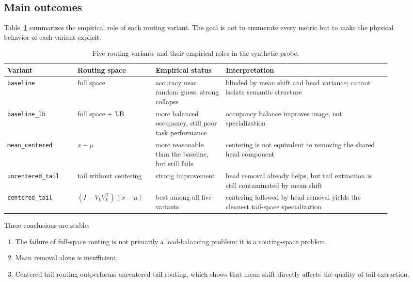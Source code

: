 \documentclass[11pt]{article}
\newcommand{\tablesize}{\footnotesize}
\begin{document}
\subsection{Main outcomes}

Table~\ref{tab:variant-summary} summarizes the empirical role of each routing variant. The goal is not to enumerate every metric but to make the physical behavior of each variant explicit.

\begin{table}[H]
\centering
\tablesize
\begin{adjustbox}{max width=\linewidth}
\begin{tabular}{>{\raggedright\arraybackslash}p{0.17\linewidth} >{\raggedright\arraybackslash}p{0.18\linewidth} >{\raggedright\arraybackslash}p{0.17\linewidth} >{\raggedright\arraybackslash}p{0.40\linewidth}}
\toprule
Variant & Routing space & Empirical status & Interpretation \\
\midrule
\texttt{baseline} & full space & accuracy near random guess; strong collapse & blinded by mean shift and head variance; cannot isolate semantic structure \\
\texttt{baseline\_lb} & full space + LB & more balanced occupancy, still poor task performance & occupancy balance improves usage, not specialization \\
\texttt{mean\_centered} & $x-\mu$ & more reasonable than the baseline, but still fails & centering is not equivalent to removing the shared head component \\
\texttt{uncentered\_tail} & tail without centering & strong improvement & head removal already helps, but tail extraction is still contaminated by mean shift \\
\texttt{centered\_tail} & $(I-V_kV_k^\top)(x-\mu)$ & best among all five variants & centering followed by head removal yields the cleanest tail-space specialization \\
\bottomrule
\end{tabular}
\end{adjustbox}
\caption{Five routing variants and their empirical roles in the synthetic probe.}
\label{tab:variant-summary}
\end{table}

Three conclusions are stable:
\begin{enumerate}
    \item The failure of full-space routing is not primarily a load-balancing problem; it is a routing-space problem.
    \item Mean removal alone is insufficient.
    \item Centered tail routing outperforms uncentered tail routing, which shows that mean shift directly affects the quality of tail extraction.
\end{enumerate}
\end{document}
